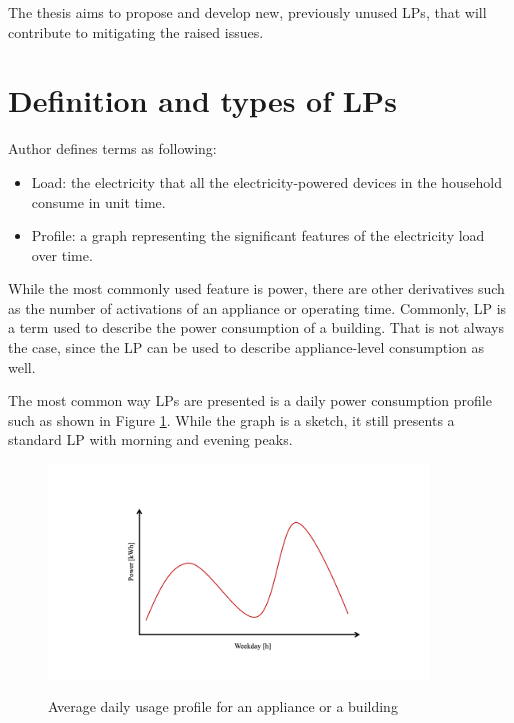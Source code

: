 The thesis aims to propose and develop new, previously unused LPs, that will contribute to mitigating the raised issues. 


\section{Definition and types of LPs}
\label{sec:LP_types}
Author \cite{Review2021} defines terms as following:

\begin{itemize}
	\item Load: the electricity that all the electricity-powered devices in the household consume in unit time.
	\item Profile: a graph representing the significant features of the electricity load over time.
\end{itemize}

While the most commonly used feature is power, there are other derivatives such as the number of activations of an appliance or operating time.
Commonly, LP is a term used to describe the power consumption of a building.
That is not always the case, since the LP can be used to describe appliance-level consumption as well. 

The most common way LPs are presented is a daily power consumption profile such as shown in Figure \ref{fig:daily_power_profile}. 
While the graph is a sketch, it still presents a standard LP with morning and evening peaks.

\begin{figure}[H]
	\centering
	\caption{Average daily usage profile for an appliance or a building}
	\includegraphics[width=0.9\textwidth]{Figures/profile_sketches/Slide1.png}
	\label{fig:daily_power_profile}
\end{figure}

